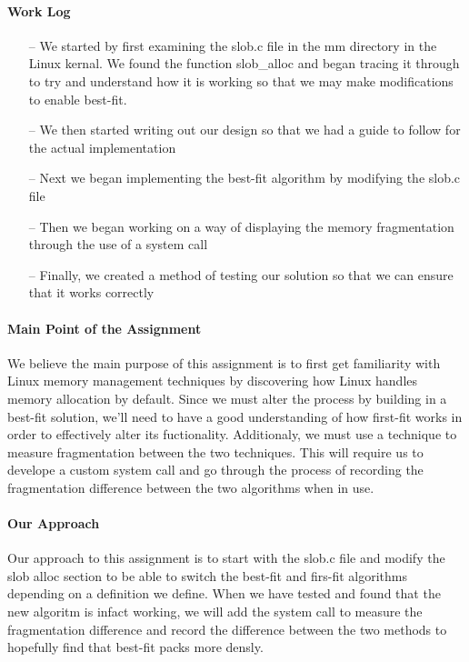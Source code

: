 \documentclass[titlepage,draftclsnofoot,onecolumn]{article}
\begin{document}
\paragraph{Work Log}
\begin{itemize}
\item [--]{We started by first examining the slob.c file in the mm directory in the Linux kernal. We found the function slob\_alloc and began tracing it through to try and understand how it is working so that we may make modifications to enable best-fit.}
\item [--]{We then started writing out our design so that we had a guide to follow for the actual implementation} 
\item[--] {Next we began implementing the best-fit algorithm by modifying the slob.c file}
\item[--] {Then we began working on a way of displaying the memory fragmentation through the use of a system call}
\item[--] {Finally, we created a method of testing our solution so that we can ensure that it works correctly}
\end{itemize}

\paragraph{Main Point of the Assignment}
We believe the main purpose of this assignment is to first get familiarity with Linux memory management techniques by discovering how Linux handles memory allocation by default. Since we must alter the process by building in a best-fit solution, we'll need to have a good understanding of how first-fit works in order to effectively alter its fuctionality. Additionaly, we must use a technique to measure fragmentation between the two techniques. This will require us to develope a custom system call and go through the process of recording the fragmentation difference between the two algorithms when in use.

\paragraph{Our Approach}
Our approach to this assignment is to start with the slob.c file and modify the slob alloc section to be able to switch the best-fit and firs-fit algorithms depending on a definition we define. When we have tested and found that the new algoritm is infact working, we will add the system call to measure the fragmentation difference and record the difference between the two methods to hopefully find that best-fit packs more densly.
\end{document}

